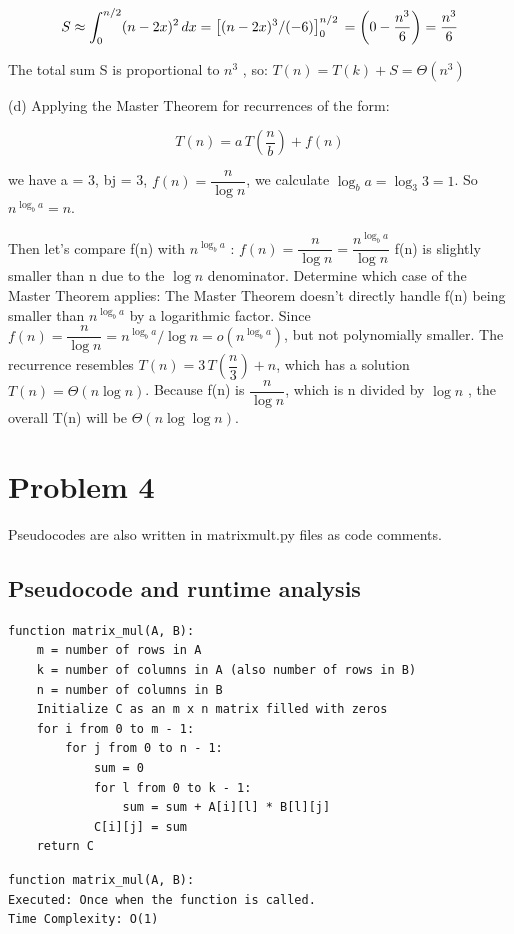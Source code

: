\documentclass[12 pt]{article}
\begin{document}
\[
S \approx \int_{0}^{n/2} (n - 2x)^2 \, dx \\
= \left[ (n - 2x)^3 / (-6) \right]_0^{n/2} \\
= \left( 0 - \frac{n^3}{6} \right) = \frac{n^3}{6}
\]

The total sum  S  is proportional to  $n^3$ , so: $T(n) = T(k) + S = \Theta(n^3)$

(d) Applying the Master Theorem for recurrences of the form:

\[
T(n) = a\, T\left( \dfrac{n}{b} \right) + f(n)
\]

we have a = 3, bj = 3, \( f(n) = \dfrac{n}{\log n} \), we calculate $\log_b a = \log_3 3 = 1$. So $n^{\log_b a} = n$.

Then let's compare  f(n)  with  $n^{\log_b a}$ : \( f(n) = \dfrac{n}{\log n} = \dfrac{n^{\log_b a}}{\log n} \)
f(n)  is slightly smaller than  n  due to the  $\log n$  denominator. Determine which case of the Master Theorem applies:
The Master Theorem doesn’t directly handle  f(n)  being smaller than  $n^{\log_b a}$  by a logarithmic factor. Since \( f(n) = \dfrac{n}{\log n} = n^{\log_b a} / \log n = o\left( n^{\log_b a} \right) \), but not polynomially smaller. The recurrence resembles \( T(n) = 3\, T\left( \dfrac{n}{3} \right) + n \), which has a solution  $T(n) = \Theta(n \log n)$. Because  f(n)  is \( \dfrac{n}{\log n} \), which is  n  divided by  $\log n$ , the overall  T(n)  will be $\Theta(n \log \log n)$.

\section*{Problem 4}
Pseudocodes are also written in matrixmult.py files as code comments.

\subsection*{Pseudocode and runtime analysis}
\begin{verbatim}
function matrix_mul(A, B):
    m = number of rows in A
    k = number of columns in A (also number of rows in B)
    n = number of columns in B
    Initialize C as an m x n matrix filled with zeros
    for i from 0 to m - 1:
        for j from 0 to n - 1:
            sum = 0
            for l from 0 to k - 1:
                sum = sum + A[i][l] * B[l][j]
            C[i][j] = sum
    return C
\end{verbatim}

\begin{verbatim}
function matrix_mul(A, B):
Executed: Once when the function is called.
Time Complexity: O(1)
\end{verbatim}
\end{document}
